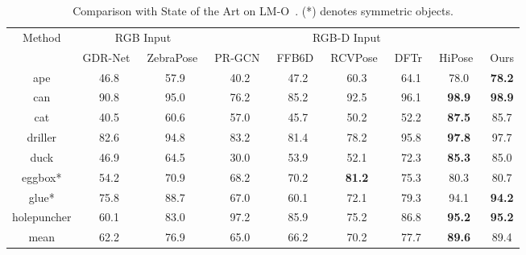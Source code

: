 \begin{table}
    \centering
    \caption{Comparison with State of the Art on LM-O~\cite{brachmann2016lmo}. (*) denotes symmetric objects.}
    \begin{tabular}{c|c|c|c|c|c|c|c|c}
    \toprule 
    \multirow{2}{*}{Method} & \multicolumn{2}{c|}{RGB Input} & \multicolumn{5}{c}{RGB-D Input} \\ 
         \cline{2-9}
      & GDR-Net~\cite{wang2021gdr} 
& ZebraPose~\cite{su2022zebrapose}&  PR-GCN~\cite{Zhou2021PRGCNAD} 
& FFB6D~\cite{he2021ffb6d} 
& RCVPose~\cite{wu2022vote} 
& DFTr~\cite{zhou2023deep} & HiPose~\cite{2024hipose} & Ours\\
    \midrule
     ape & 46.8 
& 57.9& 40.2 
& 47.2 
&  60.3 
& 64.1 &  78.0 & \textbf{78.2}\\
     can & 90.8 
& 95.0& 76.2 
& 85.2 
&  92.5 
& 96.1 &  \textbf{98.9} & \textbf{98.9}  \\
     cat & 40.5 
& 60.6& 57.0 
& 45.7 
&  50.2 
& 52.2 &  \textbf{87.5} & 85.7\\
     driller & 82.6 
& 94.8& 83.2 
& 81.4 
&  78.2 
& 95.8 &  \textbf{97.8} & 97.7\\
     duck & 46.9 
& 64.5& 30.0 
& 53.9 
&  52.1 
& 72.3 &  \textbf{85.3} & 85.0\\
     eggbox* & 54.2 
& 70.9& 68.2 
& 70.2 
&  \textbf{81.2} 
& 75.3 &  80.3 & 80.7\\
     glue* & 75.8 
& 88.7& 67.0 
& 60.1 
&  72.1 
& 79.3 & 94.1 & \textbf{94.2}\\
     holepuncher & 60.1 
& 83.0& 97.2 
& 85.9 
& 75.2 
& 86.8 &  \textbf{95.2} & \textbf{95.2} \\
     \midrule
     mean & 62.2 & 76.9&  65.0 &  66.2 &  70.2 & 77.7 & \textbf{89.6} & 89.4\\
    \bottomrule
  \end{tabular}
  \label{tab:lmo_adds}
\end{table}

